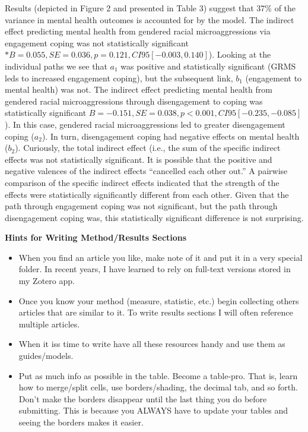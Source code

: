 \documentclass[
  11pt,
]{book}
\providecommand{\tightlist}{%
  \setlength{\itemsep}{0pt}\setlength{\parskip}{0pt}}
\begin{document}
Results (depicted in Figure 2 and presented in Table 3) suggest that 37\% of the variance in mental health outcomes is accounted for by the model. The indirect effect predicting mental health from gendered racial microaggressions via engagement coping was not statistically significant \(*B = 0.055, SE = 0.036, p = 0.121, CI95[-0.003, 0.140 ]\)). Looking at the individual paths we see that \(a_{1}\) was positive and statistically significant (GRMS leds to increased engagement coping), but the subsequent link, \(b_{1}\) (engagement to mental health) was not. The indirect effect predicting mental health from gendered racial microaggressions through disengagement to coping was statistically significant \(B = -0.151, SE = 0.038, p < 0.001, CI95[-0.235, -0.085]\)). In this case, gendered racial microaggressions led to greater disengagement coping (\(a_{2}\)). In turn, disengagement coping had negative effects on mental health (\(b_{2}\)). Curiously, the total indirect effect (i.e., the sum of the specific indirect effects was not statistically significant. It is possible that the positive and negative valences of the indirect effects ``cancelled each other out.'' A pairwise comparison of the specific indirect effects indicated that the strength of the effects were statistically significantly different from each other. Given that the path through engagement coping was not significant, but the path through disengagement coping was, this statistically significant difference is not surprising.

\textbf{Hints for Writing Method/Results Sections}

\begin{itemize}
\tightlist
\item
  When you find an article you like, make note of it and put it in a very special folder. In recent years, I have learned to rely on full-text versions stored in my Zotero app.
\item
  Once you know your method (measure, statistic, etc.) begin collecting others articles that are similar to it. To write results sections I will often reference multiple articles.\\
\item
  When it iss time to write have all these resources handy and use them as guides/models.
\item
  Put as much info as possible in the table. Become a table-pro. That is, learn how to merge/split cells, use borders/shading, the decimal tab, and so forth. Don't make the borders disappear until the last thing you do before submitting. This is because you ALWAYS have to update your tables and seeing the borders makes it easier.
\end{itemize}
\end{document}
